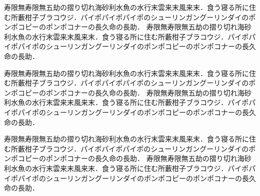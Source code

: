 \documentclass[a4j,papersize]{jsbook}
\begin{document}
寿限無寿限無五劫の摺り切れ海砂利水魚の水行末雲来末風来末．食う寝る所に住む所藪柑子ブラコウジ．パイポパイポパイポのシューリンガングーリンダイのポンポコピーのポンポコナーの長久命の長助．
寿限無寿限無五劫の摺り切れ海砂利水魚の水行末雲来末風来末．食う寝る所に住む所藪柑子ブラコウジ．パイポパイポパイポのシューリンガングーリンダイのポンポコピーのポンポコナーの長久命の長助．

寿限無寿限無五劫の摺り切れ海砂利水魚の水行末雲来末風来末．食う寝る所に住む所藪柑子ブラコウジ．パイポパイポパイポのシューリンガングーリンダイのポンポコピーのポンポコナーの長久命の長助．
寿限無寿限無五劫の摺り切れ海砂利水魚の水行末雲来末風来末．食う寝る所に住む所藪柑子ブラコウジ．パイポパイポパイポのシューリンガングーリンダイのポンポコピーのポンポコナーの長久命の長助．

寿限無寿限無五劫の摺り切れ海砂利水魚の水行末雲来末風来末．食う寝る所に住む所藪柑子ブラコウジ．パイポパイポパイポのシューリンガングーリンダイのポンポコピーのポンポコナーの長久命の長助．
寿限無寿限無五劫の摺り切れ海砂利水魚の水行末雲来末風来末．食う寝る所に住む所藪柑子ブラコウジ．パイポパイポパイポのシューリンガングーリンダイのポンポコピーのポンポコナーの長久命の長助．
\end{document}
